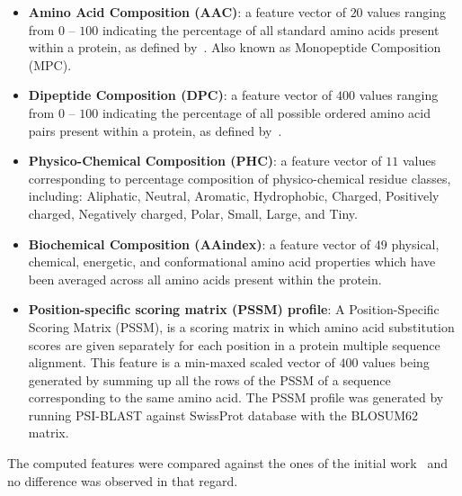 \begin{itemize}
\item \textbf{Amino Acid Composition (AAC)}: a feature vector of $20$ values ranging from $0$ -- $100$ indicating the
percentage of all standard amino acids present within a protein, as defined by~\cite{gromiha2010protein}. Also known
as Monopeptide Composition (MPC).
\item \textbf{Dipeptide Composition (DPC)}: a feature vector of $400$ values ranging from $0$ -- $100$ indicating the
percentage of all possible ordered amino acid pairs present within a protein, as defined by~\cite{gromiha2010protein}.
\item \textbf{Physico-Chemical Composition (PHC)}: a feature vector of $11$ values corresponding
to percentage composition of physico-chemical residue classes, including: Aliphatic, Neutral, Aromatic, Hydrophobic, Charged, Positively charged,
Negatively charged, Polar, Small, Large, and Tiny. 
\item \textbf{Biochemical Composition (AAindex)}: a feature vector of $49$ physical, chemical, energetic, and
conformational amino acid properties which have been averaged across all amino acids present within the protein.
\item \textbf{Position-specific scoring matrix (PSSM) profile}: A Position-Specific Scoring Matrix (PSSM), 
is a scoring matrix in which amino acid substitution scores are given separately for each position in 
a protein multiple sequence alignment. This feature is a min-maxed scaled vector of $400$ values being 
generated by summing up all the rows of the PSSM of a sequence corresponding to the same amino acid. 
The PSSM profile was generated by running PSI-BLAST against SwissProt database with the BLOSUM62 matrix.
\end{itemize}

{The computed features were compared against the ones of the initial work~\cite{mishra2014prediction} and no difference was 
observed in that regard.}
